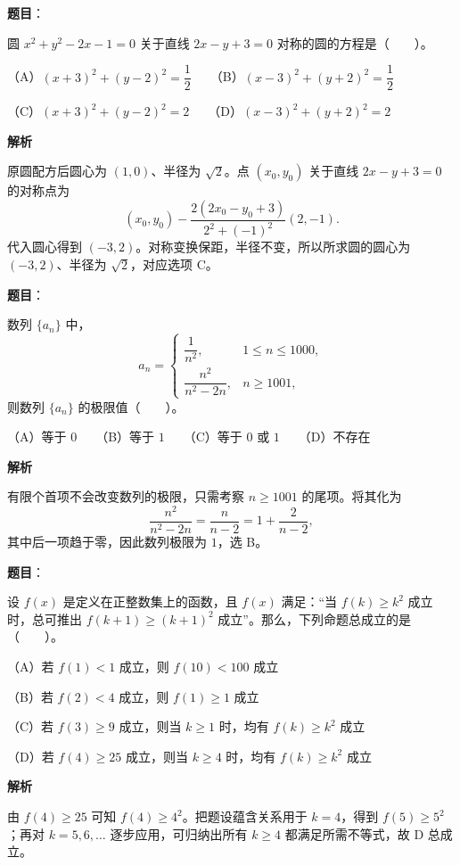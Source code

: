 \begin{answer}

\textbf{题目}：

圆 $x^2+y^2-2x-1=0$ 关于直线 $2x-y+3=0$ 对称的圆的方程是\mbox{（　　）}。

（A）$(x+3)^2+(y-2)^2=\dfrac{1}{2}$　　（B）$(x-3)^2+(y+2)^2=\dfrac{1}{2}$

（C）$(x+3)^2+(y-2)^2=2$　　（D）$(x-3)^2+(y+2)^2=2$

\textbf{解析}

原圆配方后圆心为 $(1,0)$、半径为 $\sqrt2$。点 $(x_0,y_0)$ 关于直线 $2x-y+3=0$ 的对称点为
\nopagebreak[4]
\[
(x_0,y_0)-\frac{2(2x_0-y_0+3)}{2^2+(-1)^2}(2,-1).
\]
代入圆心得到 $(-3,2)$。对称变换保距，半径不变，所以所求圆的圆心为 $(-3,2)$、半径为 $\sqrt2$，对应选项 C。


\end{answer}
\begin{answer}

\textbf{题目}：

数列 $\{a_n\}$ 中，
\nopagebreak[4]
\[
a_n=\begin{cases}
\dfrac{1}{n^2},&1\leqslant n\leqslant1000,\\
\dfrac{n^2}{n^2-2n},&n\geqslant1001,
\end{cases}
\]
则数列 $\{a_n\}$ 的极限值\mbox{（　　）}。

（A）等于 $0$　　（B）等于 $1$　　（C）等于 $0$ 或 $1$　　（D）不存在

\textbf{解析}

有限个首项不会改变数列的极限，只需考察 $n\ge1001$ 的尾项。将其化为
\nopagebreak[4]
\[
\frac{n^2}{n^2-2n}=\frac{n}{n-2}=1+\frac{2}{n-2},
\]
其中后一项趋于零，因此数列极限为 $1$，选 B。


\end{answer}
\begin{answer}

\textbf{题目}：

设 $f(x)$ 是定义在正整数集上的函数，且 $f(x)$ 满足：“当 $f(k)\geqslant k^2$ 成立时，总可推出 $f(k+1)\geqslant(k+1)^2$ 成立”。那么，下列命题总成立的是\mbox{（　　）}。

（A）若 $f(1)<1$ 成立，则 $f(10)<100$ 成立

（B）若 $f(2)<4$ 成立，则 $f(1)\geqslant1$ 成立

（C）若 $f(3)\geqslant9$ 成立，则当 $k\geqslant1$ 时，均有 $f(k)\geqslant k^2$ 成立

（D）若 $f(4)\geqslant25$ 成立，则当 $k\geqslant4$ 时，均有 $f(k)\geqslant k^2$ 成立

\textbf{解析}

由 $f(4)\ge25$ 可知 $f(4)\ge4^2$。把题设蕴含关系用于 $k=4$，得到 $f(5)\ge5^2$；再对 $k=5,6,\ldots$ 逐步应用，可归纳出所有 $k\ge4$ 都满足所需不等式，故 D 总成立。


\end{answer}

